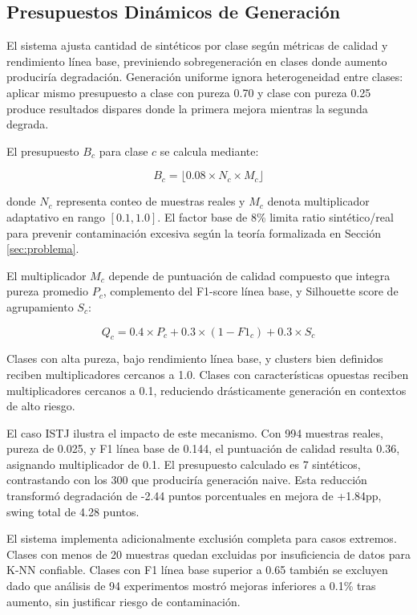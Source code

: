 \subsection{Presupuestos Dinámicos de Generación}
\label{subsec:presupuestos}

El sistema ajusta cantidad de sintéticos por clase según métricas de calidad y rendimiento línea base, previniendo sobregeneración en clases donde aumento produciría degradación. Generación uniforme ignora heterogeneidad entre clases: aplicar mismo presupuesto a clase con pureza 0.70 y clase con pureza 0.25 produce resultados dispares donde la primera mejora mientras la segunda degrada.

El presupuesto $B_c$ para clase $c$ se calcula mediante:

\begin{equation}
B_c = \lfloor 0.08 \times N_c \times M_c \rfloor
\label{eq:budget}
\end{equation}

donde $N_c$ representa conteo de muestras reales y $M_c$ denota multiplicador adaptativo en rango $[0.1, 1.0]$. El factor base de 8\% limita ratio sintético/real para prevenir contaminación excesiva según la teoría formalizada en Sección \ref{sec:problema}.

El multiplicador $M_c$ depende de puntuación de calidad compuesto que integra pureza promedio $P_c$, complemento del F1-score línea base, y Silhouette score de agrupamiento $S_c$:

\begin{equation}
Q_c = 0.4 \times P_c + 0.3 \times (1 - F1_c) + 0.3 \times S_c
\end{equation}

Clases con alta pureza, bajo rendimiento línea base, y clusters bien definidos reciben multiplicadores cercanos a 1.0. Clases con características opuestas reciben multiplicadores cercanos a 0.1, reduciendo drásticamente generación en contextos de alto riesgo.

El caso ISTJ ilustra el impacto de este mecanismo. Con 994 muestras reales, pureza de 0.025, y F1 línea base de 0.144, el puntuación de calidad resulta 0.36, asignando multiplicador de 0.1. El presupuesto calculado es 7 sintéticos, contrastando con los 300 que produciría generación naive. Esta reducción transformó degradación de -2.44 puntos porcentuales en mejora de +1.84pp, swing total de 4.28 puntos.

El sistema implementa adicionalmente exclusión completa para casos extremos. Clases con menos de 20 muestras quedan excluidas por insuficiencia de datos para K-NN confiable. Clases con F1 línea base superior a 0.65 también se excluyen dado que análisis de 94 experimentos mostró mejoras inferiores a 0.1\% tras aumento, sin justificar riesgo de contaminación.

